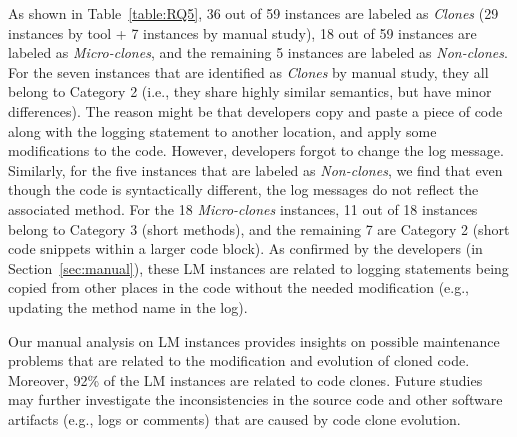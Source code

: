 
 As shown in Table~\ref{table:RQ5}, 36 out of 59 instances are labeled as {\em Clones} (29 instances by tool + 7 instances by manual study), 18 out of 59 instances are labeled as {\em Micro-clones}, and the remaining 5 instances are labeled as {\em Non-clones}. For the seven instances that are identified as {\em Clones} by manual study, they all belong to Category 2 (i.e., they share highly similar semantics, but have minor differences). The reason might be that developers copy and paste a piece of code along with the logging statement to another location, and apply some modifications to the code. However, developers forgot to change the log message. Similarly, for the five instances that are labeled as {\em Non-clones}, we find that even though the code is syntactically different, the log messages do not reflect the associated method. For the 18 {\em Micro-clones} instances, 11 out of 18 instances belong to Category 3 (short methods), and the remaining 7 are Category 2 (short code snippets within a larger code block). As confirmed by the developers (in Section~\ref{sec:manual}), these LM instances are related to logging statements being copied from other places in the code without the needed modification (e.g., updating the method name in the log). 

Our manual analysis on LM instances provides insights on possible maintenance problems that are related to the modification and evolution of cloned code. Moreover, 92\% of the LM instances are related to code clones. Future studies may further investigate the inconsistencies in the source code and other software artifacts (e.g., logs or comments) that are caused by code clone evolution.


